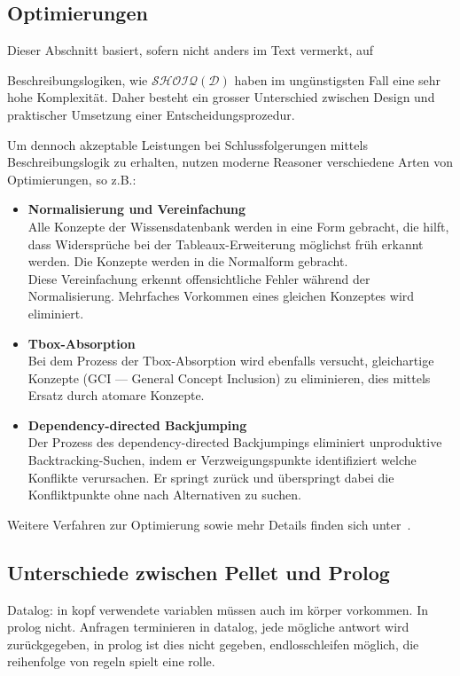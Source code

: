 \subsection{Optimierungen}
\label{subsection:inferenz_pellet_opti}
Dieser Abschnitt basiert, sofern nicht anders im Text vermerkt, auf~\cite[Seiten 16 bis 19]{sirin:pellet05}

Beschreibungslogiken, wie $\mathcal{SHOIQ}(\mathcal{D})$ haben im ungünstigsten Fall eine sehr hohe Komplexität. Daher besteht ein grosser Unterschied zwischen Design und praktischer Umsetzung einer Entscheidungsprozedur.

Um dennoch akzeptable Leistungen bei Schlussfolgerungen mittels Beschreibungslogik zu erhalten, nutzen moderne Reasoner verschiedene Arten von Optimierungen, so z.B.:

\begin{itemize}
    \item \textbf{Normalisierung und Vereinfachung}\\
        Alle Konzepte der Wissensdatenbank werden in eine Form gebracht, die hilft, dass Widersprüche bei der Tableaux-Erweiterung möglichst früh erkannt werden. Die Konzepte werden in die Normalform gebracht.\\
        Diese Vereinfachung erkennt offensichtliche Fehler während der Normalisierung. Mehrfaches Vorkommen eines gleichen Konzeptes wird eliminiert.

    \item \textbf{Tbox-Absorption}\\
        Bei dem Prozess der Tbox-Absorption wird ebenfalls versucht, gleichartige Konzepte (GCI --- General Concept Inclusion) zu eliminieren, dies mittels Ersatz durch atomare Konzepte.

    \item \textbf{Dependency-directed Backjumping}\\
        Der Prozess des dependency-directed Backjumpings eliminiert unproduktive Backtracking-Suchen, indem er Verzweigungspunkte identifiziert welche Konflikte verursachen. Er springt zurück und überspringt dabei die Konfliktpunkte ohne nach Alternativen zu suchen.
\end{itemize}

Weitere Verfahren zur Optimierung sowie mehr Details finden sich unter~\cite[S. 17 bis 19]{sirin:pellet05}.


\subsection{Unterschiede zwischen Pellet und Prolog}
\label{}
Datalog: in kopf verwendete variablen müssen auch im körper vorkommen. In prolog nicht. Anfragen terminieren in datalog, jede mögliche antwort wird zurückgegeben, in prolog ist dies nicht gegeben, endlosschleifen möglich, die reihenfolge von regeln spielt eine rolle.~\cite[Seite 175]{laemmel}

